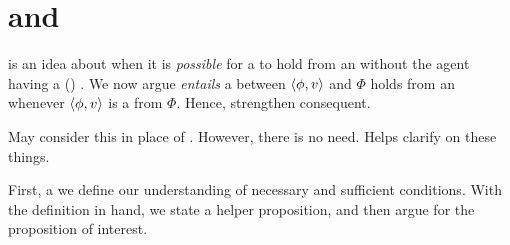 \section{ and }
\label{cha:fc:fc-sII}

\begin{note}
  \supportII{} is an idea about when it is \emph{possible} for a \ros{} to hold from an \agpe{} without the agent having a (\pwP{}) \wit{}.
  We now argue \supportII{} \emph{entails} a \ros{} between \(\langle \phi, v \rangle\) and \(\Phi\) holds from an \agpe{} whenever \(\langle \phi, v \rangle\) is a \fc{} from \(\Phi\).
  Hence, strengthen consequent.

  May consider this in place of \supportII{}.
  However, there is no need.
  Helps clarify  on these things.
\end{note}

\begin{note}
  First, a we define our understanding of necessary and sufficient conditions.
  With the definition in hand, we state a helper proposition, and then argue for the proposition of interest.
\end{note}

